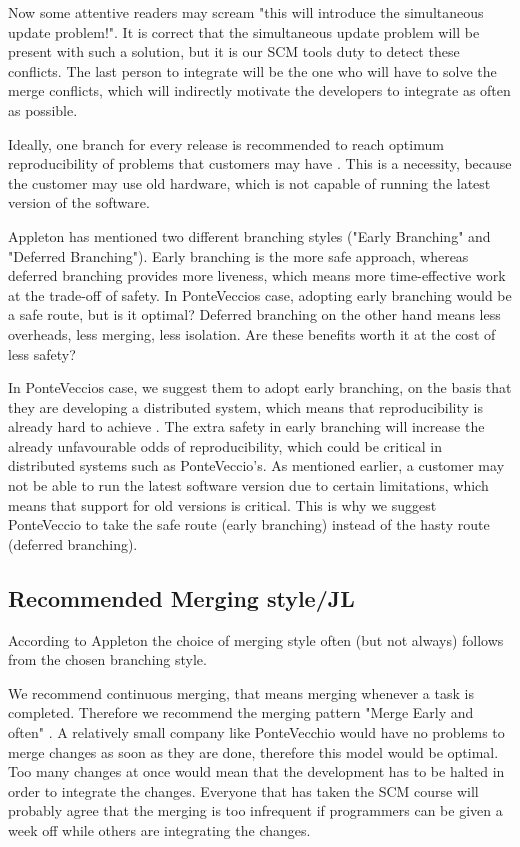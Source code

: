 \documentclass[10pt]{article}
\begin{document}
\noindent Now some attentive readers may scream "this will introduce the simultaneous update problem!"\cite{Babich}. It is correct that the simultaneous update problem will be present with such a solution, but it is our SCM tools duty to detect these conflicts. The last person to integrate will be the one who will have to solve the merge conflicts, which will indirectly motivate the developers to integrate as often as possible.

\noindent Ideally, one branch for every release is recommended to reach optimum reproducibility of problems that customers may have \cite{Vance}. This is a necessity, because the customer may use old hardware, which is not capable of running the latest version of the software.

\noindent Appleton \cite{Appleton} has mentioned two different branching styles ("Early Branching" and "Deferred Branching"). Early branching is the more safe approach, whereas deferred branching provides more liveness\cite{Appleton}, which means more time-effective work at the trade-off of safety. In PonteVeccios case, adopting early branching would be a safe route, but is it optimal? Deferred branching on the other hand means less overheads, less merging, less isolation. Are these benefits worth it at the cost of less safety? 

\noindent{}In PonteVeccios case, we suggest them to adopt early branching, on the basis that they are developing a distributed system, which means that reproducibility is already hard to achieve \cite{Bays}. The extra safety in early branching will increase the already unfavourable odds of reproducibility, which could be critical in distributed systems such as PonteVeccio's. As mentioned earlier, a customer may not be able to run the latest software version due to certain limitations, which means that support for old versions is critical. This is why we suggest PonteVeccio to take the safe route (early branching) instead of the hasty route (deferred branching).

\subsection{Recommended Merging style/JL}
\noindent According to Appleton \cite{Appleton} the choice of merging style often (but not always) follows from the chosen branching style.

\noindent We recommend continuous merging, that means merging whenever a task is completed. Therefore we recommend the merging pattern "Merge Early and often" \cite{Appleton}. A relatively small company like PonteVecchio would have no problems to merge changes as soon as they are done, therefore this model would be optimal. Too many changes at once would mean that the development has to be halted in order to integrate the changes. Everyone that has taken the SCM course will probably agree that the merging is too infrequent if programmers can be given a week off while others are integrating the changes.
\end{document}
